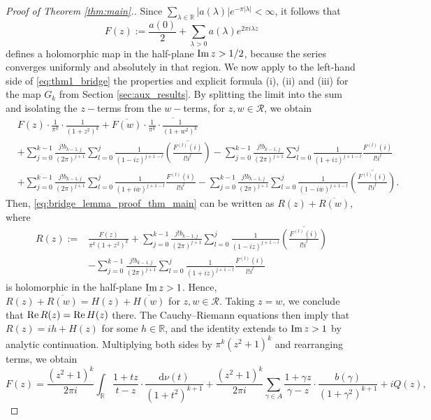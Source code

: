 \documentclass[a4paper,reqno,12pt]{amsart}
\newcommand{\R}{\mathcal{R}}
\renewcommand{\r}{\mathbb{R}}
\newcommand{\la}{\lambda}
\newcommand{\ga}{\gamma}
\renewcommand{\d}{\mathrm{d}}
\newcommand{\ov}[1]{\overline{#1}}
\newcommand{\w}{\ov{w}}
\newcommand{\cd}{\cdot}
\newcommand{\1}{{\bf 1}}
\renewcommand{\Re}{{\rm Re}\,}
\renewcommand{\Im}{{\rm Im}\,}
\begin{document}
\begin{proof}[Proof of Theorem \ref{thm:main}.]
Since $\sum_{\la\in\r} |a(\la)|e^{-\pi|\la|}<\infty$, it follows that
\begin{equation}
\label{eq:thm1_def_of_F}
    F(z):=\frac{a(0)}{2}+\sum_{\la>0} a(\la)e^{2\pi i\la z}
\end{equation}
defines a holomorphic map in the half-plane $\Im{z}>1/2$, because the series converges uniformly and absolutely in that region. We now apply to the left-hand side of \eqref{eq:thm1_bridge} the properties and explicit formula (i), (ii) and (iii) for the map $G_k$ from Section \ref{sec:aux_results}. By splitting the limit into the sum and isolating the $z-$terms from the $w-$terms, for $z,w\in\R$, we obtain
\begin{align}
\label{eq:bridge_lemma_proof_thm_main}
&F(z)\cd\frac{1}{\pi^k}\cd\frac{1}{(1+z^2)^k}+\ov{F(w)}\cd\ov{\frac{1}{\pi^k}\cd\frac{1}{(1+w^2)^k}}\\
&+\sum_{j=0}^{k-1} \frac{j!b_{k-1,j}}{(2\pi)^{j+1}} \sum_{l=0}^{j} \frac{1}{(1-iz)^{j+1-l}}\ov{\left(\frac{F^{(l)}(i)}{l!i^l}\right)}-\sum_{j=0}^{k-1} \frac{j!b_{k-1,j}}{(2\pi)^{j+1}} \sum_{l=0}^{j} \frac{1}{(1+iz)^{j+1-l}}\frac{F^{(l)}(i)}{l!i^l} \\
&+\sum_{j=0}^{k-1} \frac{j!b_{k-1,j}}{(2\pi)^{j+1}} \sum_{l=0}^{j} \frac{1}{(1+i\w)^{j+1-l}}\frac{F^{(l)}(i)}{l!i^l} -\sum_{j=0}^{k-1} \frac{j!b_{k-1,j}}{(2\pi)^{j+1}} \sum_{l=0}^{j} \frac{1}{(1-i\w)^{j+1-l}}\ov{\left(\frac{F^{(l)}(i)}{l!i^l}\right)}.
\end{align}
Then, \eqref{eq:bridge_lemma_proof_thm_main} can be written as $R(z)+\ov{R(w)}$, where
\begin{align}
    R(z):=&\frac{F(z)}{\pi^k(1+z^2)^k}+\sum_{j=0}^{k-1} \frac{j!b_{k-1,j}}{(2\pi)^{j+1}}\sum_{l=0}^{j} \frac{1}{(1-iz)^{j+1-l}}\ov{\left(\frac{F^{(l)}(i)}{l!i^l}\right)}\\
    &-\sum_{j=0}^{k-1} \frac{j!b_{k-1,j}}{(2\pi)^{j+1}}\sum_{l=0}^{j} \frac{1}{(1+iz)^{j+1-l}}\frac{F^{(l)}(i)}{l!i^l}
\end{align}
is holomorphic in the half-plane $\Im{z}>1$. Hence, $R(z)+\ov{R(w)}=H(z)+\ov{H(w)}$ for $z,w\in\R$. Taking $z=w$, we conclude that $\Re{R(z)}=\Re{H(z)}$ there. The Cauchy--Riemann equations then imply that $R(z)=ih+H(z)$ for some $h\in\r$, and the identity extends to $\Im{z}>1$ by analytic continuation. Multiplying both sides by $\pi^k(z^2+1)^k$ and rearranging terms, we obtain
\begin{equation}
\label{eq:thm1_F_extension}
    F(z)=\frac{(z^2+1)^k}{2\pi i} \int_{\r} \frac{1+tz}{t-z}\cd \frac{\d\nu(t)}{(1+t^2)^{k+1}}+\frac{(z^2+1)^k}{2\pi i} \sum_{\ga\in A} \frac{1+\ga z}{\ga-z}\cd \frac{b(\ga)}{(1+\ga^2)^{k+1}}+iQ(z),

\end{equation}
\end{proof}
\end{document}
